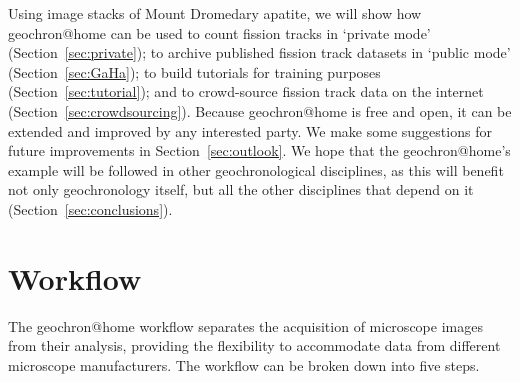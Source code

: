 \documentclass{article}
\begin{document}
Using image stacks of Mount Dromedary apatite, we will show how
geochron@home can be used to count fission tracks in `private mode'
(Section~\ref{sec:private}); to archive published fission track
datasets in `public mode' (Section~\ref{sec:GaHa}); to build tutorials
for training purposes (Section~\ref{sec:tutorial}); and to
crowd-source fission track data on the internet
(Section~\ref{sec:crowdsourcing}). Because geochron@home is free and
open, it can be extended and improved by any interested party. We make
some suggestions for future improvements in
Section~\ref{sec:outlook}. We hope that the geochron@home's example
will be followed in other geochronological disciplines, as this will
benefit not only geochronology itself, but all the other disciplines
that depend on it (Section~\ref{sec:conclusions}).

\section{Workflow}\label{sec:architecture}

The geochron@home workflow separates the acquisition of microscope
images from their analysis, providing the flexibility to accommodate
data from different microscope manufacturers. The workflow can be
broken down into five steps.
\end{document}
